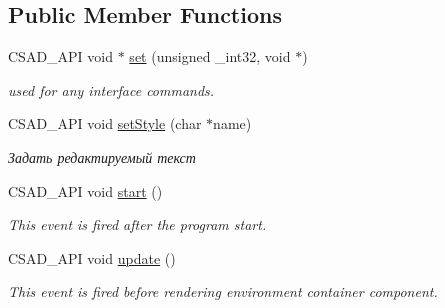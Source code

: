 \subsection*{Public Member Functions}
\begin{DoxyCompactItemize}
\item 
\hypertarget{classcsad_1_1_s_g_table_a75eab0af569c25ac1a1ad1b24a41ac75}{C\-S\-A\-D\-\_\-\-A\-P\-I void $\ast$ \hyperlink{classcsad_1_1_s_g_table_a75eab0af569c25ac1a1ad1b24a41ac75}{set} (unsigned \-\_\-int32, void $\ast$)}\label{classcsad_1_1_s_g_table_a75eab0af569c25ac1a1ad1b24a41ac75}

\begin{DoxyCompactList}\small\item\em used for any interface commands. \end{DoxyCompactList}\item 
\hypertarget{classcsad_1_1_s_g_table_a64ec6a06f51d8b7d05bab1d40a441512}{C\-S\-A\-D\-\_\-\-A\-P\-I void \hyperlink{classcsad_1_1_s_g_table_a64ec6a06f51d8b7d05bab1d40a441512}{set\-Style} (char $\ast$name)}\label{classcsad_1_1_s_g_table_a64ec6a06f51d8b7d05bab1d40a441512}

\begin{DoxyCompactList}\small\item\em Задать редактируемый текст \end{DoxyCompactList}\item 
\hypertarget{classcsad_1_1_s_g_table_ae126133833123f83a508d75e176aa048}{C\-S\-A\-D\-\_\-\-A\-P\-I void \hyperlink{classcsad_1_1_s_g_table_ae126133833123f83a508d75e176aa048}{start} ()}\label{classcsad_1_1_s_g_table_ae126133833123f83a508d75e176aa048}

\begin{DoxyCompactList}\small\item\em This event is fired after the program start. \end{DoxyCompactList}\item 
\hypertarget{classcsad_1_1_s_g_table_a638deff0606055500ce94fde9bfe5351}{C\-S\-A\-D\-\_\-\-A\-P\-I void \hyperlink{classcsad_1_1_s_g_table_a638deff0606055500ce94fde9bfe5351}{update} ()}\label{classcsad_1_1_s_g_table_a638deff0606055500ce94fde9bfe5351}

\begin{DoxyCompactList}\small\item\em This event is fired before rendering environment container component. \end{DoxyCompactList}\end{DoxyCompactItemize}
